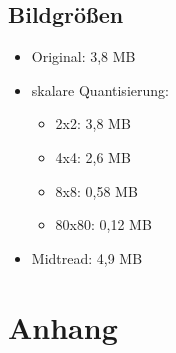\clearpage

\subsection{Bildgrößen}
\begin{itemize}
	\item Original: 3,8 MB
	\item skalare Quantisierung:
		\begin{itemize}
			\item 2x2:		3,8 MB
			\item 4x4:		2,6 MB
			\item 8x8:		0,58 MB
			\item 80x80: 	0,12 MB 
		\end{itemize}
	\item Midtread: 4,9 MB
\end{itemize}













\section{Anhang}

